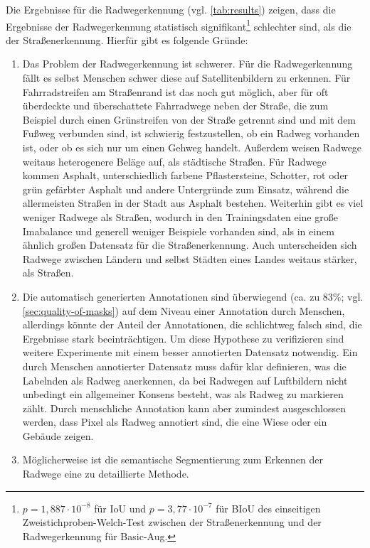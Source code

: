 Die Ergebnisse für die Radwegerkennung (vgl. \autoref{tab:results}) zeigen, dass die Ergebnisse der 
Radwegerkennung statistisch signifikant\footnote{
	$p = 1,887\cdot 10^{-8}$ für IoU und $p = 3,77\cdot 10^{-7}$ für BIoU
	des einseitigen Zweistichproben-Welch-Test zwischen der Straßenerkennung 
	und der Radwegerkennung für Basic-Aug. 
} schlechter sind, als die der Straßenerkennung. Hierfür gibt es folgende Gründe:
\begin{enumerate}
	\item Das Problem der Radwegerkennung ist schwerer. Für die Radwegerkennung fällt es selbst Menschen schwer 
	diese auf Satellitenbildern zu erkennen. Für Fahrradstreifen am Straßenrand ist das noch gut möglich, 
	aber für oft überdeckte und überschattete Fahrradwege neben der Straße, die zum Beispiel durch einen Grünstreifen 
	von der Straße getrennt sind und mit dem Fußweg verbunden sind, ist schwierig festzustellen, ob ein Radweg 
	vorhanden ist, oder ob es sich nur um einen Gehweg handelt. Außerdem weisen Radwege weitaus 
	heterogenere Beläge auf, als städtische Straßen. Für Radwege kommen Asphalt, unterschiedlich farbene Pflastersteine,
	Schotter, rot oder grün gefärbter Asphalt und andere Untergründe zum Einsatz, 
	während die allermeisten Straßen in der Stadt aus Asphalt bestehen.
	Weiterhin gibt es viel weniger Radwege als Straßen, wodurch in den Trainingsdaten eine große Imabalance 
	und generell weniger Beispiele vorhanden sind, als in einem ähnlich großen Datensatz für die Straßenerkennung. 
	Auch unterscheiden sich Radwege zwischen Ländern und selbst Städten eines Landes weitaus stärker, als Straßen.
	\item Die automatisch generierten Annotationen sind überwiegend (ca. zu 83\%; vgl. \autoref{sec:quality-of-masks})
	auf dem Niveau einer Annotation durch Menschen, allerdings könnte der Anteil der Annotationen, die schlichtweg
	falsch sind, die Ergebnisse stark beeinträchtigen. Um diese Hypothese zu verifizieren sind weitere 
	Experimente mit einem besser annotierten Datensatz notwendig. Ein durch Menschen annotierter Datensatz 
	muss dafür klar definieren, was die Labelnden als Radweg anerkennen, da bei Radwegen auf Luftbildern 
	nicht unbedingt ein allgemeiner Konsens besteht, was als Radweg zu markieren zählt. Durch menschliche Annotation 
	kann aber zumindest ausgeschlossen werden, dass Pixel als Radweg annotiert sind, die eine Wiese oder ein Gebäude zeigen.
	\item Möglicherweise ist die semantische Segmentierung zum Erkennen der Radwege eine zu detaillierte Methode. 

\end{enumerate}
